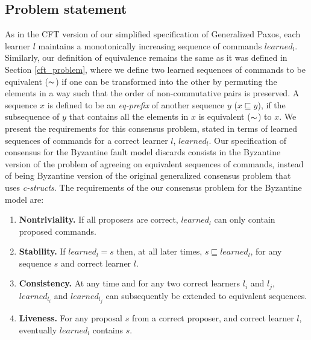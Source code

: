 \subsection{Problem statement}
As in the CFT version of our simplified specification of Generalized Paxos, each learner $l$ maintains a monotonically increasing sequence of commands $learned_l$. Similarly, our definition of equivalence remains the same as it was defined in Section \ref{cft_problem}, where we define two learned sequences of commands to be equivalent ($\thicksim$) if one can be transformed into the other by permuting the elements in a way such that the order of non-commutative pairs is preserved. A sequence $x$ is defined to be an \textit{eq-prefix} of another sequence $y$ ($x \sqsubseteq y$), if the subsequence of $y$ that contains all the elements in $x$ is equivalent ($\thicksim$) to $x$. 
We present the requirements for this consensus problem, stated in terms of learned sequences of commands for a correct learner $l$, $learned_l$. 
Our specification of consensus for the Byzantine fault model discards consists in the Byzantine version of the problem of agreeing on equivalent sequences of commands, instead of being Byzantine version of the original generalized consensus problem that uses \textit{c-structs}. The requirements of the our consensus problem for the Byzantine model are:\par
%
\begin{enumerate}
	\item \textbf{Nontriviality.} If all proposers are correct, $learned_l$ can only contain proposed commands.
	\item \textbf{Stability.} If $learned_l = s$ then, at all later times, $s \sqsubseteq learned_l$, for any sequence $s$ and correct learner $l$.
	\item \textbf{Consistency.} At any time and for any two correct learners $l_i$ and $l_j$, $learned_{l_i}$ and $learned_{l_j}$ can subsequently be extended to equivalent sequences.
	\item \textbf{Liveness.} For any proposal $s$ from a correct proposer, and correct learner $l$, eventually $learned_l$ contains $s$.
\end{enumerate}
